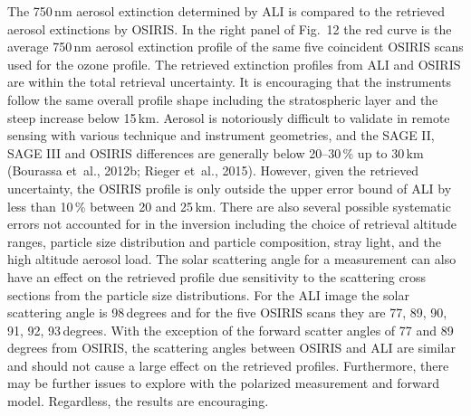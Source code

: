 \documentclass[amtd, online, hvmath]{copernicus}
\begin{document}
The 750\,\unit{nm} aerosol extinction determined by ALI is compared to the retrieved aerosol extinctions by OSIRIS. In the right panel of Fig.~12 the red curve is the average 750\,\unit{nm} aerosol extinction profile of the
same five coincident OSIRIS scans used for the ozone profile. The
retrieved extinction profiles from ALI and OSIRIS are within the
total retrieval uncertainty. It is encouraging that the instruments follow the same overall profile shape
including the stratospheric layer and the steep increase below
15\,\unit{km}. Aerosol is notoriously
difficult to validate in remote sensing with various technique and
instrument geometries, and the SAGE II, SAGE III and OSIRIS
differences are generally below 20--30\,{\%} up to 30\,\unit{km}
(Bourassa et~al., 2012b; Rieger et~al., 2015). However, given the retrieved uncertainty, the OSIRIS profile
is only outside the upper error bound of ALI by less than
10\,{\%} between 20 and 25\,\unit{km}. There are also several possible systematic errors not
accounted for in the inversion including the choice of retrieval
altitude ranges, particle size distribution and  particle composition, stray
light, and the high altitude aerosol load. The solar scattering angle for a measurement can also have an effect on the retrieved profile due sensitivity to the scattering cross sections from the particle size distributions. For the ALI image the solar scattering angle is 98\,degrees and for the five OSIRIS scans they are 77, 89, 90, 91, 92, 93\,degrees. With the exception of the forward scatter angles of 77 and 89\,degrees from OSIRIS, the scattering angles between OSIRIS and ALI are similar and should not cause a large effect on the retrieved profiles. Furthermore, there may be
further issues to explore with the polarized measurement and forward
model. Regardless, the results are encouraging.
\end{document}
